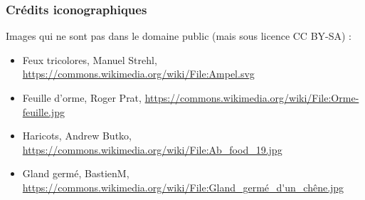 \subsubsection*{Crédits iconographiques}
Images qui ne sont pas dans le domaine public (mais sous licence CC BY-SA) :
\begin{itemize}
\item Feux tricolores, Manuel Strehl, \url{https://commons.wikimedia.org/wiki/File:Ampel.svg}
\item Feuille d’orme, Roger Prat, \url{https://commons.wikimedia.org/wiki/File:Orme-feuille.jpg}
\item Haricots, Andrew Butko, \url{https://commons.wikimedia.org/wiki/File:Ab_food_19.jpg}
\item Gland germé, BastienM, \url{https://commons.wikimedia.org/wiki/File:Gland_germé_d'un_chêne.jpg}
\end{itemize}


